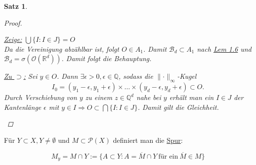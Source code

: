 \documentclass[a4paper]{report}
\newcommand{\PowerSet}{\mathcal{P}}
\newcommand{\R}{\mathbb{R}}
\newcommand{\Q}{\mathbb{Q}}
\newcommand{\Borel}{\mathcal{B}}
\newcommand{\Bd}{\Borel_d}
\newcommand{\jlabel}[1]{\label{j_#1}}
\newcommand{\jhyperref}[2]{\hyperref[j_#1]{#2}}
\newcommand{\jlink}[1]{\jhyperref{#1}{#1}}
\newcommand{\jspacesmall}{\vspace{4pt}}
\theoremstyle{plain}
\newtheorem{satz}[thm]{Satz}
\theoremstyle{definition}
\begin{document}
{\begin{satz}
\begin{proof}
\begin{enumerate}
                \jspacesmall
                
                \uline{Zeige:} $\bigcup \{I : I \in J\} = O$\\
                Da die Vereinigung abzählbar ist, folgt $O \in A_1$. Damit $\Bd \subset A_1$ nach \jlink{Lem 1.6} und $\Bd = \sigma(\mathcal{O}(\R^d))$. Damit folgt die Behauptung.
                
                \jspacesmall
                
                \uline{Zu $\supset$:} Sei $y \in O$. Dann $\exists \epsilon > 0, \epsilon \in \Q$, sodass die $\lVert \cdot \rVert_\infty$-Kugel
                \begin{displaymath}
                    I_0 = (y_1-\epsilon, y_1 + \epsilon) \times \dots \times (y_d-\epsilon, y_d + \epsilon) \subset O.
                \end{displaymath}
                Durch Verschiebung von $y$ zu einem $z\in \Q^d$ nahe bei $y$ erhält man ein $I\in J$ der Kantenlänge $\epsilon$ mit $y \in I \Rightarrow O \subset \bigcap\{I: I\in J\}$. Damit gilt die Gleichheit.
        \end{enumerate}
    \end{proof}
\end{satz}

Für $Y\subset X, Y \ne \emptyset$ und $M \subset \PowerSet(X)$ definiert man die \uline{Spur}:

\jlabel{(1.1)}
\begin{equation}
    M_y = M \cap Y := \{A \subset Y: A = \overline{M} \cap Y \ \text{für ein} \ \overline{M} \in M\}
\end{equation}

}
\end{document}
